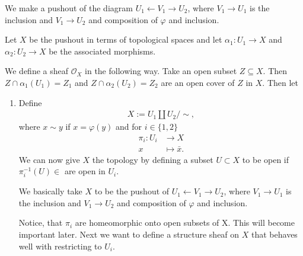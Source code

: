 \newcommand{\sheet}{5}




\maketitle{}

\begin{exercise}{1}
        \item{We make a pushout of the diagram $U_1 \leftarrow V_1 \rightarrow
            U_2$, where $V_1 \rightarrow U_1$ is the inclusion and $V_1
            \rightarrow U_2$ and composition of $\varphi$ and inclusion.

            Let $X$ be the pushout in terms of topological spaces and let
            $\alpha_1 \colon U_1 \rightarrow X$ and $\alpha_2 \colon U_2
            \rightarrow X$ be the associated morphisms.

            We define a sheaf $\mathcal{O}_X$ in the following way. Take an open
            subset $Z \subseteq X$. Then $Z \cap \alpha_1(U_1) = Z_1$ and $Z
            \cap \alpha_2(U_2) = Z_2$ are an open cover of $Z$ in $X$. Then let}

    \begin{enumerate}
        \item{Define 
            \begin{align*}
                X:=U_1 \coprod U_2/\!{\sim},
            \end{align*}
            where $x\sim y$ if $x=\varphi(y)$ and for $i\in \lbrace
            1,2\rbrace$
            \begin{align*}
                \pi_i \colon U_i &\to X\\
                x& \mapsto \bar{x}.
            \end{align*}
            We can now give $X$ the topology by defining a subset $U\subset X$ to be
            open if $\pi^{-1}_i(U)\in$ are open in $U_i$.

            We basically take $X$ to be the pushout of $U_1 \leftarrow V_1
            \rightarrow U_2$, where $V_1 \rightarrow U_1$ is the inclusion and
            $V_1 \rightarrow U_2$ and composition of $\varphi$ and inclusion.

            Notice, that $\pi_i$ are homeomorphic onto open subsets of X. This
            will become important later. Next we want to define a structure
            sheaf on $X$ that behaves well with restricting to $U_i.$

}
\end{enumerate}
\end{exercise}
